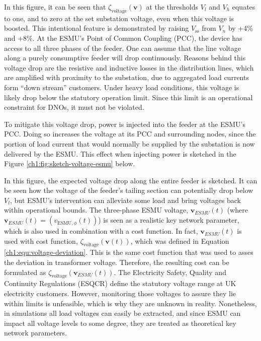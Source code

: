 

In this figure, it can be seen that $\zeta_\text{voltage}(\textbf{v})$ at the thresholds $V_l$ and $V_h$ equates to one, and to zero at the set substation voltage, even when this voltage is boosted.
This intentional feature is demonstrated by raising $V_\text{ss}$ from $V_n$ by +4\% and +8\%.
At the ESMU's Point of Common Coupling (PCC), the device has access to all three phases of the feeder.
One can assume that the line voltage along a purely consumptive feeder will drop continuously.
Reasons behind this voltage drop are the resistive and inductive losses in the distribution lines, which are amplified with proximity to the substation, due to aggregated load currents form ``down stream'' customers.
Under heavy load conditions, this voltage is likely drop below the statutory operation limit.
Since this limit is an operational constraint for DNOs, it must not be violated.

To mitigate this voltage drop, power is injected into the feeder at the ESMU's PCC.
Doing so increases the voltage at its PCC and surrounding nodes, since the portion of load current that would normally be supplied by the substation is now delivered by the ESMU.
This effect when injecting power is sketched in the Figure \ref{ch1:fig:sketch-voltage-esmu} below.




In this figure, the expected voltage drop along the entire feeder is sketched. 
It can be seen how the voltage of the feeder's tailing section can potentially drop below $V_l$, but ESMU's intervention can alleviate some load and bring voltages back within operational bounds.
The three-phase ESMU voltage, $\textbf{v}_{ESMU}(t)$ (where $\textbf{v}_{ESMU}(t) = (v_{\text{ESMU},\phi}(t))$) is seen as a realistic key network parameter, which is also used in combination with a cost function.
In fact, $\textbf{v}_{ESMU}(t)$ is used with cost function, $\zeta_\text{voltage}(\textbf{v}(t))$, which was defined in Equation \ref{ch1:equ:voltage-deviation}.
This is the same cost function that was used to asses the deviation in transformer voltage.
Therefore, the resulting cost can be formulated as $\zeta_\text{voltage}(\textbf{v}_{ESMU}(t))$.
The Electricity Safety, Quality and Continuity Regulations (ESQCR) define the statutory voltage range at UK electricity customers.
However, monitoring those voltages to assure they lie within limits is unfeasible, which is why they are unknown in reality.
Nonetheless, in simulations all load voltages can easily be extracted, and since ESMU can impact all voltage levels to some degree, they are treated as theoretical key network parameters.

